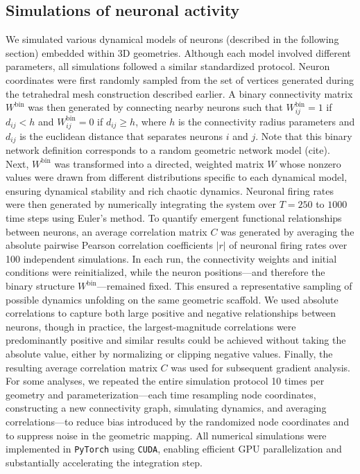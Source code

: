 \documentclass{article}
\begin{document}
\subsection*{Simulations of neuronal activity}

We simulated various dynamical models of neurons (described in the following section) embedded within 3D geometries. Although each model involved different parameters, all simulations followed a similar standardized protocol. Neuron coordinates were first randomly sampled from the set of vertices generated during the tetrahedral mesh construction described earlier. A binary connectivity matrix $W^{\text{bin}}$ was then generated by connecting nearby neurons such that $W^{\text{bin}}_{ij}=1$ if $d_{ij} < h$ and $W^{\text{bin}}_{ij}=0$ if $d_{ij} \geq h$, where $h$ is the connectivity radius parameters and $d_{ij}$ is the euclidean distance that separates neurons $i$ and $j$. Note that this binary network definition corresponds to a random geometric network model (cite). Next, $W^{\text{bin}}$ was transformed into a directed, weighted matrix $W$ whose nonzero values were drawn from different distributions specific to each dynamical model, ensuring dynamical stability and rich chaotic dynamics. Neuronal firing rates were then generated by numerically integrating the system over $T=250$ to $1000$ time steps using Euler's method. To quantify emergent functional relationships between neurons, an average correlation matrix $C$ was generated by averaging the absolute pairwise Pearson correlation coefficients $|r|$ of neuronal firing rates over 100 independent simulations. In each run, the connectivity weights and initial conditions were reinitialized, while the neuron positions---and therefore the binary structure $W^{\text{bin}}$---remained fixed. This ensured a representative sampling of possible dynamics unfolding on the same geometric scaffold. We used absolute correlations to capture both large positive and negative relationships between neurons, though in practice, the largest-magnitude correlations were predominantly positive and similar results could be achieved without taking the absolute value, either by normalizing or clipping negative values. Finally, the resulting average correlation matrix $C$ was used for subsequent gradient analysis. For some analyses, we repeated the entire simulation protocol 10 times per geometry and parameterization---each time resampling node coordinates, constructing a new connectivity graph, simulating dynamics, and averaging correlations---to reduce bias introduced by the randomized node coordinates and to suppress noise in the geometric mapping. All numerical simulations were implemented in \verb|PyTorch| using \verb|CUDA|, enabling efficient GPU parallelization and substantially accelerating the integration step.
\end{document}
